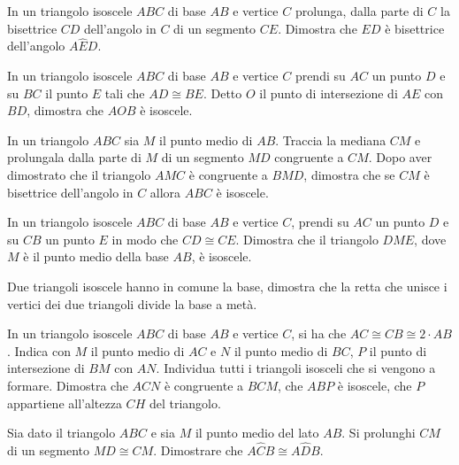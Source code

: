 \begin{multicols}{2}
\begin{esercizio}
\label{ese:2.41}
In un triangolo isoscele $ABC$ di base $AB$ e vertice $C$ prolunga, dalla parte di $C$ la bisettrice $CD$ dell'angolo in $C$ di un segmento $CE$. Dimostra che $ED$ è bisettrice dell'angolo $A\widehat{E}D$.
\end{esercizio}

\begin{esercizio}
\label{ese:2.42}
In un triangolo isoscele $ABC$ di base $AB$ e vertice $C$ prendi su $AC$ un punto $D$ e su $BC$ il punto $E$ tali che $AD\cong BE$. Detto $O$ il punto di intersezione di $AE$ con $BD$, dimostra che $AOB$ è isoscele.
\end{esercizio}

\begin{esercizio}
\label{ese:2.43}
In un triangolo $ABC$ sia $M$ il punto medio di $AB$. Traccia la mediana $CM$ e prolungala dalla parte di $M$ di un segmento $MD$ congruente a $CM$. Dopo aver dimostrato che il triangolo $AMC$ è congruente a $BMD$, dimostra che se $CM$ è bisettrice dell'angolo in $C$ allora $ABC$ è isoscele.
\end{esercizio}

\begin{esercizio}
\label{ese:2.44}
In un triangolo isoscele $ABC$ di base $AB$ e vertice $C$, prendi su $AC$ un punto $D$ e su $CB$ un punto $E$ in modo che $CD\cong CE$. Dimostra che il triangolo $DME$, dove $M$ è il punto medio della base $AB$, è isoscele.
\end{esercizio}

\begin{esercizio}
\label{ese:2.45}
Due triangoli isoscele hanno in comune la base, dimostra che la retta che unisce i vertici dei due triangoli divide la base a metà.
\end{esercizio}

\begin{esercizio}
\label{ese:2.46}
In un triangolo isoscele $ABC$ di base $AB$ e vertice $C$, si ha che $AC\cong CB\cong 2\cdot AB$. Indica con $M$ il punto medio di $AC$ e $N$ il punto medio di $BC$, $P$ il punto di intersezione di $BM$ con $AN$. Individua tutti i triangoli isosceli che si vengono a formare. Dimostra che $ACN$ è congruente a $BCM$, che $ABP$ è isoscele, che $P$ appartiene all'altezza $CH$ del triangolo.
\end{esercizio}

\begin{esercizio}
\label{ese:2.47}
Sia dato il triangolo $ABC$ e sia $M$ il punto medio del lato $AB$. Si prolunghi $CM$ di un segmento $MD\cong CM$. Dimostrare che $A\widehat{C}B\cong A\widehat{D}B$.
\end{esercizio}


\end{multicols}
